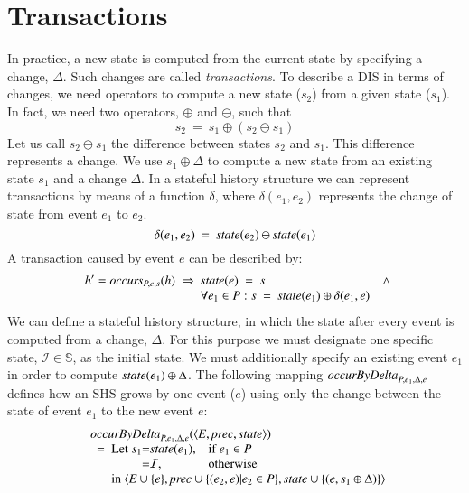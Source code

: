 \documentclass{elsarticle}
\def\id#1{\text{\em #1\/}}
\def\Events{{\mathit E}}
\begin{document}
\section{Transactions}
\label{sct:Transactions}
	In practice, a new state is computed from the current state by specifying a change, $\Delta$.
	Such changes are called {\em transactions}.
	To describe a DIS in terms of changes, we need operators to compute a new state ($s_2$) from a given state ($s_1$).
	In fact, we need two operators, $\oplus$ and $\ominus$, such that
\begin{equation}
	s_2\ =\ s_1\oplus(s_2\ominus s_1)
\label{req:oplus and ominus}
\end{equation}
	Let us call $s_2\ominus s_1$ the difference between states $s_2$ and $s_1$.
	This difference represents a change.
	We use $s_1\oplus\Delta$ to compute a new state from an existing state $s_1$ and a change $\Delta$.
	In a stateful history structure we can represent transactions by means of a function $\delta$,
	where $\delta(e_1,e_2)$ represents the change of state from event $e_1$ to $e_2$.
\begin{equation}
	\delta(e_1,e_2)\ =\ \id{state}(e_2)\ominus\id{state}(e_1)
\label{def:delta}
\end{equation}
	A transaction caused by event $e$ can be described by:
\begin{eqnarray}
&&	h'=\id{occurs}_{P,e,s}(h)\ \Rightarrow\ \begin{array}[t]{@{}ll}
		\id{state}(e)\ =\ s&\wedge\\
		\forall e_1\in P: s\ =\ \id{state}(e_1)\oplus\delta(e_1,e)
	\end{array}
\label{req:transaction}
\end{eqnarray}
	We can define a stateful history structure,
	in which the state after every event is computed from a change, $\Delta$.
	For this purpose we must designate one specific state, $\mathcal I\in\mathbb S$, as the initial state.
	We must additionally specify an existing event $e_1$ in order to compute $\id{state}(e_1)\oplus\Delta$.
	The following mapping $\id{occurByDelta}_{P,e_1,\Delta,e}$ defines how an SHS grows by one event ($e$)
	using only the change between the state of event $e_1$ to the new event $e$:
\begin{eqnarray}
&&\begin{array}{l}
	\id{occurByDelta}_{P,e_1,\Delta,e}(\la\Events, \id{prec}, \id{state}\ra)\\
	\ \ =\ \begin{array}[t]{@{}l@{}c@{}ll}
		\text{Let }s_1&=&\id{state}(e_1)\text{,}&\text{if }e_1\in P\\
				&=&\mathcal I\text{,}&\text{otherwise}\\
		\multicolumn{4}{@{}l}{\text{in }\la\Events\cup\{e\}, \id{prec}\cup\{(e_2,e)|e_2\in P\}, \id{state}\cup\{(e,s_1\oplus\Delta)\}\ra}
		\end{array}
\end{array}
\label{req:SHS by Delta}
\end{eqnarray}
\end{document}
